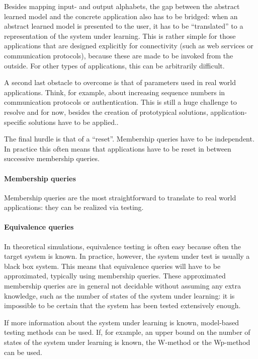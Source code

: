 \documentclass[multi,crop=false,class=article]{standalone}
\begin{document}
Besides mapping input- and output alphabets, the gap between the abstract learned model
and the concrete application also has to be bridged: when an abstract learned
model is presented to the user, it has to be ``translated'' to a representation
of the system under learning. This is rather simple for those applications that
are designed explicitly for connectivity (such as web services or communication
protocols), because these are made to be invoked from the outside. For other
types of applications, this can be arbitrarily difficult.

A second last obstacle to overcome is that of parameters used in real world
applications. Think, for example, about increasing sequence numbers in
communication protocols or authentication. This is still a huge challenge to
resolve and for now, besides the creation of prototypical solutions,
application-specific solutions have to be applied.\cite{Steffen11a}.

The final hurdle is that of a ``reset''. Membership queries have to be
independent. In practice this often means that applications have to be reset in
between successive membership queries.

\paragraph{Membership queries}
Membership queries are the most straightforward to translate to real world
applications: they can be realized via testing. %


\paragraph{Equivalence queries}\label{para:equiv_queries} In theoretical simulations, equivalence testing
is often easy because often the target system is known. In practice, however,
the system under test is usually a black box system. This means that equivalence
queries will have to be approximated, typically using membership queries. These
approximated membership queries are in general not decidable without assuming
any extra knowledge, such as the number of states of the system under
learning: it is impossible to be certain that the system has been tested
extensively\cite{Steffen11a} enough.

If more information about the system under learning is known, model-based
testing methods can be used. If, for example, an upper bound on the number of
states of the system under learning is known, the
W-method\cite{Chow78} or the
Wp-method\cite{Fujiwara91} can be used.
\end{document}
